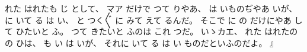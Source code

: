 れた
はれたも
じ
として、
%
マア
だけで
つて
りやあ、
%
は
いものぢやあ
いが、
%
に
いて
る
は
い、
%
%
と
つく〴〵
に
みて
えて
るんだ。
%
そこで
に
の
%
だけにやあ
して
ひたいと
ふ。
%
つて
きたいと
ふのは
これ
つだ。
%
いゝカエ、
%
れた
はれたの
の
ひは、
%
も
%
い
は
いが、
%
それに
いて
る
は
い
ものだといふのだよ。
』%
